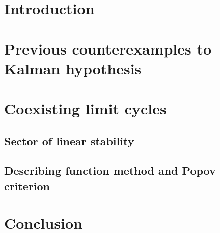 \documentclass{ifacconf}
\theoremstyle{plain}
\begin{document}
\section{Introduction}
\section{Previous counterexamples to Kalman hypothesis}
\section{Coexisting limit cycles}
\subsection{Sector of linear stability}
\subsection{Describing function method and Popov criterion}
\section{Conclusion}
\end{document}
